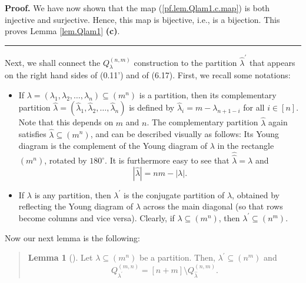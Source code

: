 \documentclass[numbers=enddot,12pt,final,onecolumn,notitlepage]{scrartcl}%
\newenvironment{statement}{\begin{quote}}{\end{quote}}
\theoremstyle{definition}
\newtheorem{lem}[theo]{Lemma}
\newenvironment{lemmain}[1][]
{\begin{statement}\begin{lem}[#1]}
{\end{lem}\end{statement}}
\newenvironment{proof}[1][Proof]{\noindent\textbf{#1.} }{\ \rule{0.5em}{0.5em}}
\newenvironment{lemmain}[1][Proof]{\noindent\textbf{#1.} }{\ \rule{0.5em}{0.5em}}
\begin{document}
\begin{enumerate}
\begin{proof}
We have now shown that the map (\ref{pf.lem.Qlam1.c.map}) is both injective
and surjective. Hence, this map is bijective, i.e., is a bijection. This
proves Lemma \ref{lem.Qlam1} \textbf{(c)}.
\end{proof}

Next, we shall connect the $Q_{\lambda}^{\left(  n,m\right)  }$ construction
to the partition $\widehat{\lambda}^{\prime}$ that appears on the right hand
sides of (0.11') and of (6.17). First, we recall some notations:

\begin{itemize}
\item If $\lambda=\left(  \lambda_{1},\lambda_{2},\ldots,\lambda_{n}\right)
\subseteq\left(  m^{n}\right)  $ is a partition, then its complementary
partition $\widehat{\lambda}=\left(  \widehat{\lambda}_{1},\widehat{\lambda
}_{2},\ldots,\widehat{\lambda}_{n}\right)  $ is defined by $\widehat{\lambda
}_{i}=m-\lambda_{n+1-i}$ for all $i\in\left[  n\right]  $. Note that this
depends on $m$ and $n$. The complementary partition $\widehat{\lambda}$ again
satisfies $\widehat{\lambda}\subseteq\left(  m^{n}\right)  $, and can be
described visually as follows: Its Young diagram is the complement of the
Young diagram of $\lambda$ in the rectangle $\left(  m^{n}\right)  $, rotated
by $180^{\circ}$. It is furthermore easy to see that
$\widehat{\widehat{\lambda}}=\lambda$ and%
\begin{equation}
\left\vert \widehat{\lambda}\right\vert =nm-\left\vert \lambda\right\vert .
\label{p20.complement.size}%
\end{equation}


\item If $\lambda$ is any partition, then $\lambda^{\prime}$ is the conjugate
partition of $\lambda$, obtained by reflecting the Young diagram of $\lambda$
across the main diagonal (so that rows become columns and vice versa).
Clearly, if $\lambda\subseteq\left(  m^{n}\right)  $, then $\lambda^{\prime
}\subseteq\left(  n^{m}\right)  $.
\end{itemize}

Now our next lemma is the following:

\begin{lemmain}
\label{lem.Qlam2}Let $\lambda\subseteq\left(  m^{n}\right)  $ be a partition.
Then, $\lambda^{\prime}\subseteq\left(  n^{m}\right)  $ and
\[
Q_{\lambda^{\prime}}^{\left(  m,n\right)  }=\left[  n+m\right]  \setminus
Q_{\widehat{\lambda}}^{\left(  n,m\right)  }.
\]

\end{lemmain}


\end{enumerate}
\end{document}
